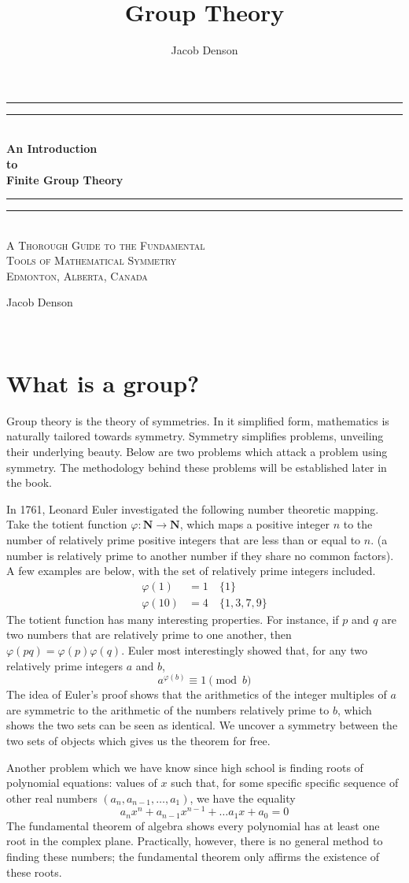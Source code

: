 \documentclass[12pt]{amsbook}
\title{Group Theory}
\author{Jacob Denson}
\theoremstyle{definition}
\newcommand*{\plogo}{\fbox{$\mathcal{PL}$}} %
\newcommand*{\titleGP}{\begingroup %
\centering %
\vspace*{\baselineskip} %

\rule{\textwidth}{1.6pt}\vspace*{-\baselineskip}\vspace*{2pt} %
\rule{\textwidth}{0.4pt}\\[\baselineskip] %

{\bf \Huge An Introduction\\ to \\[0.3\baselineskip] Finite Group Theory}\\[0.2\baselineskip] %

\rule{\textwidth}{0.4pt}\vspace*{-\baselineskip}\vspace{3.2pt} %
\rule{\textwidth}{1.6pt}\\[\baselineskip] %

\scshape %
\Large
A Thorough Guide to the Fundamental\\
Tools of Mathematical Symmetry\\[\baselineskip] %

\large Edmonton, Alberta, Canada\par %

\vspace*{2\baselineskip} %

{\Huge Jacob Denson\par} %

\vfill %

{\scshape \the\year} \\[0.3\baselineskip] %

\endgroup}
\begin{document}

\titleGP %

\tableofcontents


\chapter{What is a group?}

Group theory is the theory of symmetries. In it simplified form, mathematics is naturally tailored towards symmetry. Symmetry simplifies problems, unveiling their underlying beauty. Below are two problems which attack a problem using symmetry. The methodology behind these problems will be established later in the book.

In 1761, Leonard Euler investigated the following number theoretic mapping. Take the totient function $\varphi:\mathbf{N} \to \mathbf{N}$, which maps a positive integer $n$ to the number of relatively prime positive integers that are less than or equal to $n$. (a number is relatively prime to another number if they share no common factors). A few examples are below, with the set of relatively prime integers included.
%
\begin{align*}
    \varphi(1) &= 1\ &\{1\}\\
    \varphi(10) &= 4\ &\{1,3,7,9\}
\end{align*}
%
The totient function has many interesting properties. For instance, if $p$ and $q$ are two numbers that are relatively prime to one another, then $\varphi(pq) = \varphi(p)\varphi(q)$. Euler most interestingly showed that, for any two relatively prime integers $a$ and $b$,
%
\[ a^{\varphi(b)} \equiv 1 \pmod{b} \]
%
The idea of Euler's proof shows that the arithmetics of the integer multiples of $a$ are symmetric to the arithmetic of the numbers relatively prime to $b$, which shows the two sets can be seen as identical. We uncover a symmetry between the two sets of objects which gives us the theorem for free.

Another problem which we have know since high school is finding roots of polynomial equations: values of $x$ such that, for some specific specific sequence of other real numbers $(a_n,a_{n-1},\dots,a_1)$, we have the equality
%
\[ a_nx^n + a_{n-1}x^{n-1} + \dots a_1x + a_0 = 0 \]
%
The fundamental theorem of algebra shows every polynomial has at least one root in the complex plane. Practically, however, there is no general method to finding these numbers; the fundamental theorem only affirms the existence of these roots.
\end{document}
